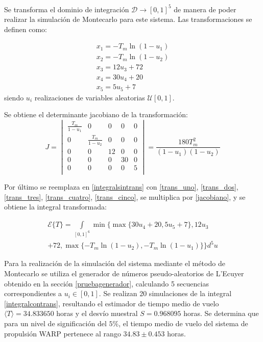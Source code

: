 \documentclass{sig-alternate}
\begin{document}
Se transforma el dominio de integraci\'on $\mathcal{D} \to [0,1]^5$ de manera de poder 
realizar la simulaci\'on de Montecarlo para este sistema. Las transformaciones se definen como:

\begin{eqnarray}
	\label{trans_uno}
	x_1 = - T_m \ln (1 - u_1) \\
	\label{trans_dos}
	x_2 = - T_m \ln (1 - u_2) \\
	\label{trans_tres}
	x_3 = 12 u_3 + 72 \\
	\label{trans_cuatro}
	x_4 = 30 u_4 + 20 \\
	\label{trans_cinco}
	x_5 = 5 u_5 + 7
\end{eqnarray}
siendo $u_i$ realizaciones de variables aleatorias $\mathcal{U}[0,1]$.

Se obtiene el determinante jacobiano de la transformaci\'on:
\begin{equation}
	\label{jacobiano}
	J =
		\begin{vmatrix}
			\frac{T_m}{1 - u_1} & 0  & 0  & 0  & 0 \\
			0 & \frac{T_m}{1 - u_2} & 0  & 0  & 0  \\
			0 & 0 & 12 & 0 & 0 \\
			0 & 0 & 0 & 30  & 0 \\
			0 & 0 & 0 & 0 & 5 \\
		\end{vmatrix}
	=
		\frac{180 T_m^2}{(1-u_1)(1-u_2)}
\end{equation}

Por \'ultimo se reemplaza en \eqref{integralsintrans} con
\eqref{trans_uno}, \eqref{trans_dos}, \eqref{trans_tres}, \eqref{trans_cuatro}, \eqref{trans_cinco}, 
se multiplica por \eqref{jacobiano}, y se obtiene la integral transformada:

\begin{eqnarray}
\label{integralcontrans}
	\mathcal{E} \{ T \} =	\int\limits_{[0,1]^6} \min\{ \max \{ 30 u_4 + 20, 5 u_5 + 7 \} , 12 u_3
	\nonumber
	\\
	 + 72 , \max \{- T_m \ln (1 - u_2), - T_m \ln (1 - u_1)\}\} d^5u
\end{eqnarray}

Para la realizaci\'on de la simulaci\'on del sistema mediante el m\'etodo de Montecarlo 
se utiliza el generador de n\'umeros pseudo-aleatorios de L'Ecuyer obtenido en la secci\'on \ref{pruebagenerador},
calculando 5 secuencias correspondientes a $u_i \in [0,1]$. Se realizan 20 simulaciones  
de la integral \eqref{integralcontrans}, resultando el
estimador de tiempo medio de vuelo $\langle T \rangle = 34.833650$ horas y el desv\'io muestral
$S = 0.968095$ horas. Se determina que para un nivel de significaci\'on del $5\%$, el tiempo medio de vuelo
del sistema de propulsi\'on WARP pertenece al rango $ 34.83 \pm 0.453 $ horas.
\end{document}
